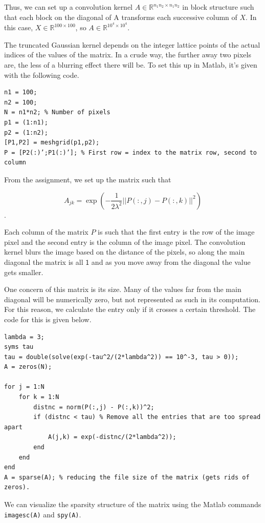 \documentclass{article}
\begin{document}
Thus, we can set up a convolution kernel $A \in \mathbb{R}^{n_{1}n_{2} \times n_{1}n_{2}}$ in block structure such that each block on the diagonal of A transforms each successive column of $X$. In this case, $X \in \mathbb{R}^{100\times 100}$, so $A \in \mathbb{R}^{10^4 \times 10^4}$.

The truncated Gaussian kernel depends on the integer lattice points of the actual indices of the values of the matrix. In a crude way, the further away two pixels are, the less of a blurring effect there will be. To set this up in Matlab, it's given with the following code. 

\begin{verbatim}
n1 = 100;
n2 = 100;
N = n1*n2; % Number of pixels
p1 = (1:n1);
p2 = (1:n2);
[P1,P2] = meshgrid(p1,p2);
P = [P2(:)’;P1(:)’]; % First row = index to the matrix row, second to column
\end{verbatim}

From the assignment, we set up the matrix such that

\[A_{jk} = \exp(-\frac{1}{2\lambda^2} ||P(:,j) - P(:,k)||^2)\].

Each column of the matrix $P$ is such that the first entry is the row of the image pixel and the second entry is the column of the image pixel. The convolution kernel blurs the image based on the distance of the pixels, so along the main diagonal the matrix is all $\mathsf 1$ and as you move away from the diagonal the value gets smaller.

One concern of this matrix is its size. Many of the values far from the main diagonal will be numerically zero, but not represented as such in its computation. For this reason, we calculate the entry only if it crosses a certain threshold. The code for this is given below.

\begin{verbatim}
lambda = 3;
syms tau 
tau = double(solve(exp(-tau^2/(2*lambda^2)) == 10^-3, tau > 0));
A = zeros(N);

for j = 1:N
    for k = 1:N
        distnc = norm(P(:,j) - P(:,k))^2;
        if (distnc < tau) % Remove all the entries that are too spread apart
            A(j,k) = exp(-distnc/(2*lambda^2));
        end
    end
end
A = sparse(A); % reducing the file size of the matrix (gets rids of zeros).
\end{verbatim}

We can visualize the sparsity structure of the matrix using the Matlab commands \texttt{imagesc(A)} and \texttt{spy(A)}.
\end{document}
